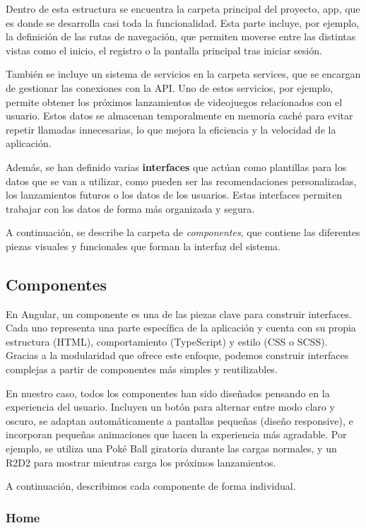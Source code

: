 Dentro de esta estructura se encuentra la carpeta principal del proyecto, app, que es donde se desarrolla casi toda la funcionalidad. Esta parte incluye, por ejemplo, la definición de las rutas de navegación, que permiten moverse entre las distintas vistas como el inicio, el registro o la pantalla principal tras iniciar sesión.

También se incluye un sistema de servicios en la carpeta services, que se encargan de gestionar las conexiones con la API. Uno de estos servicios, por ejemplo, permite obtener los próximos lanzamientos de videojuegos relacionados con el usuario. Estos datos se almacenan temporalmente en memoria caché para evitar repetir llamadas innecesarias, lo que mejora la eficiencia y la velocidad de la aplicación.

Además, se han definido varias \textbf{interfaces} que actúan como plantillas para los datos que se van a utilizar, como pueden ser las recomendaciones personalizadas, los lanzamientos futuros o los datos de los usuarios. Estas interfaces permiten trabajar con los datos de forma más organizada y segura.

A continuación, se describe la carpeta de \textit{componentes}, que contiene las diferentes piezas visuales y funcionales que forman la interfaz del sistema.

\subsection{Componentes}

En Angular, un componente es una de las piezas clave para construir interfaces. Cada uno representa una parte específica de la aplicación y cuenta con su propia estructura (HTML), comportamiento (TypeScript) y estilo (CSS o SCSS). Gracias a la modularidad que ofrece este enfoque, podemos construir interfaces complejas a partir de componentes más simples y reutilizables.

En nuestro caso, todos los componentes han sido diseñados pensando en la experiencia del usuario. Incluyen un botón para alternar entre modo claro y oscuro, se adaptan automáticamente a pantallas pequeñas (diseño responsive), e incorporan pequeñas animaciones que hacen la experiencia más agradable. Por ejemplo, se utiliza una Poké Ball giratoria durante las cargas normales, y un R2D2 para mostrar mientras carga los próximos lanzamientos.

A continuación, describimos cada componente de forma individual.

\subsubsection{Home}

